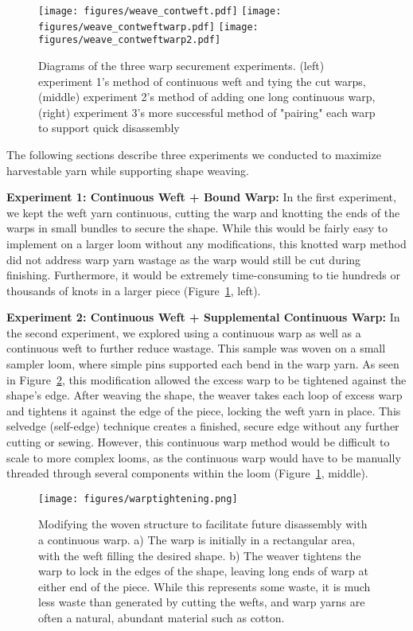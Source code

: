 \documentclass{sigchi}
\newcommand\laura[1]{#1}
\begin{document}
\begin{figure}[h!]
    \centering
    \texttt{[image: figures/weave\_contweft.pdf]}
    \texttt{[image: figures/weave\_contweftwarp.pdf]}
    \texttt{[image: figures/weave\_contweftwarp2.pdf]}
    \caption{Diagrams of the three warp securement experiments. (left) experiment 1's method of continuous weft and tying the cut warps, (middle) experiment 2's method of adding one long continuous warp, (right) experiment 3's more successful method of "pairing" each warp to support quick disassembly}
    \label{fig:warpDiagrams}
\end{figure}

The following sections describe three experiments we conducted to maximize harvestable yarn while supporting shape weaving.

\textbf{Experiment 1: Continuous Weft + Bound Warp:} In the first experiment, we  kept the weft yarn continuous, cutting the warp and knotting the ends of the warps in small bundles to secure the shape. While this would be fairly easy to implement on a larger loom without any modifications, this knotted warp method did not address warp yarn wastage as the warp would still be cut during finishing. Furthermore, it would be extremely time-consuming to tie hundreds or thousands of knots in a larger piece (Figure~\ref{fig:warpDiagrams}, left).

\textbf{Experiment 2: Continuous Weft + Supplemental Continuous Warp:} In the second experiment, we explored using a continuous warp as well as a continuous weft to further reduce wastage. This sample was woven on a small sampler loom, where simple pins supported each bend in the warp yarn. %
As seen in Figure~\ref{fig:warptightening}, this modification allowed the excess warp to be tightened against the shape's edge. After weaving the shape, the weaver takes each loop of excess warp and tightens it against the edge of the piece, locking the weft yarn in place. This selvedge (self-edge) technique creates a finished, secure edge without any further cutting or sewing. However, this continuous warp method would be difficult to scale to more complex looms, as the continuous warp would have to be manually threaded through several components within the loom (Figure~\ref{fig:warpDiagrams}, middle).

\begin{figure}[t!]
    \centering
    \texttt{[image: figures/warptightening.png]}
    \caption{Modifying the woven structure to facilitate future disassembly with a continuous warp. a) The warp is initially in a rectangular area, with the weft filling the desired shape. b) The weaver tightens the warp to lock in the edges of the shape, leaving long ends of warp at either end of the piece. While this represents some waste, it is much less waste than generated by cutting the wefts, and warp yarns are often a natural, abundant material such as cotton.}
    \label{fig:warptightening}
\end{figure}
\end{document}
